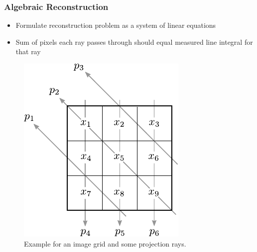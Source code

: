 \begin{frame}
	\frametitle{Algebraic Reconstruction}

	\begin{itemize}
		\item Formulate reconstruction problem as a system of linear equations
		\item Sum of pixels each ray passes through should
		      equal measured line integral for that ray
	\end{itemize}

	\begin{figure}[tbp]
		\centering
		\includegraphics[height=0.6\textheight]{images/algebraic_1}
		\caption{Example for an image grid and some projection rays.}
		\label{fig:ct_algebraic_1}
	\end{figure}
\end{frame}


